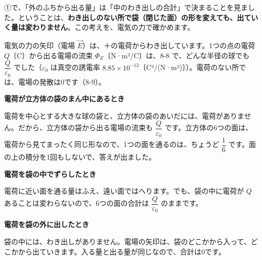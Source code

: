 
\leavevmode\label{bk:8-11:fukurokae}①で、「外のふちから出る量」は「中のわき出しの合計」で決まることを見ました。ということは、\textbf{わき出しのない所で袋（閉じた面）の形を変えても、出ていく量は変わりません}。この考えを、電気の力で確かめます。

\noindent 電気の力の矢印（電場 $\vec E$）は、＋の電荷からわき出しています。1つの点の電荷 $Q$〔C〕から出る電場の流束 $\Phi_E$〔N·m²/C〕は、8-8 で、どんな半径の球でも $\dfrac{Q}{\varepsilon_0}$ でした（$\varepsilon_0$ は真空の誘電率 $8.85\times10^{-12}$〔C²/(N·m²)〕）。電荷のない所では、電場の発散は0です（8-9）。

\begin{bkfigure}
\label{bk:8-11:fig-cube}
\end{bkfigure}
\begin{enumerate}[label={\bkcircled[\bkTT]{\arabic*}}, leftmargin=2.4\zw, itemsep=2pt, topsep=2pt]
\item \textbf{電荷が立方体の袋のまん中にあるとき}\par\nobreak\noindent 電荷を中心とする大きな球の袋と、立方体の袋のあいだには、電荷がありません。だから、立方体の袋から出る電場の流束も $\dfrac{Q}{\varepsilon_0}$ です。立方体の6つの面は、電荷から見てまったく同じ形なので、1つの面を通るのは、ちょうど $\dfrac{1}{6}$ です。面の上の積分を1回もしないで、答えが出ました。
\item \textbf{電荷を袋の中でずらしたとき}\par\nobreak\noindent 電荷に近い面を通る量はふえ、遠い面ではへります。でも、袋の中に電荷が $Q$ あることは変わらないので、6つの面の合計は $\dfrac{Q}{\varepsilon_0}$ のままです。
\item \textbf{電荷を袋の外に出したとき}\par\nobreak\noindent 袋の中には、わき出しがありません。電場の矢印は、袋のどこかから入って、どこかから出ていきます。入る量と出る量が同じなので、合計は0です。
\end{enumerate}
